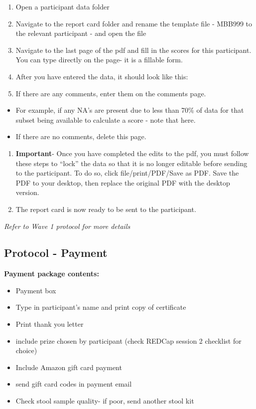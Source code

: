 \documentclass[]{book}
\begin{document}
\begin{enumerate}
\def\labelenumi{\arabic{enumi}.}
\item
  Open a participant data folder
\item
  Navigate to the report card folder and rename the template file - MBB999 to the relevant participant - and open the file
\item
  Navigate to the last page of the pdf and fill in the scores for this participant. You can type directly on the page- it is a fillable form.
\item
  After you have entered the data, it should look like this:
\item
  If there are any comments, enter them on the comments page.
\end{enumerate}

\begin{itemize}
\item
  For example, if any NA's are present due to less than 70\% of data for that subset being available to calculate a score - note that here.
\item
  If there are no comments, delete this page.
\end{itemize}

\begin{enumerate}
\def\labelenumi{\arabic{enumi}.}
\setcounter{enumi}{5}
\item
  \textbf{Important}- Once you have completed the edits to the pdf, you must follow these steps to ``lock'' the data so that it is no longer editable before sending to the participant. To do so, click file/print/PDF/Save as PDF. Save the PDF to your desktop, then replace the original PDF with the desktop version.
\item
  The report card is now ready to be sent to the participant.
\end{enumerate}

\emph{Refer to Wave 1 protocol for more details}

\hypertarget{protocol---payment-3}{%
\subsection{Protocol - Payment}\label{protocol---payment-3}}

\textbf{Payment package contents:}

\begin{itemize}
\item
  Payment box
\item
  Type in participant's name and print copy of certificate
\item
  Print thank you letter
\item
  include prize chosen by participant (check REDCap session 2 checklist for choice)
\item
  Include Amazon gift card payment
\item
  send gift card codes in payment email
\item
  Check stool sample quality- if poor, send another stool kit
\end{itemize}
\end{document}
